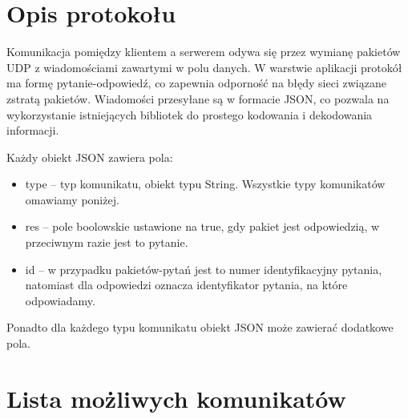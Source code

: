 \documentclass[a4paper, 10pt]{article}
\begin{document}
\tableofcontents

\newpage
\section{Opis protokołu}
Komunikacja pomiędzy klientem a serwerem odywa się przez wymianę pakietów UDP z wiadomościami zawartymi w polu danych. W warstwie aplikacji protokół ma formę pytanie-odpowiedź, co zapewnia odporność na błędy sieci związane zstratą pakietów. Wiadomości przesyłane są w formacie JSON, co pozwala na wykorzystanie istniejących bibliotek do prostego kodowania i dekodowania informacji.

Każdy obiekt JSON zawiera pola:
\begin{itemize}
 \item type -- typ komunikatu, obiekt typu String. Wszystkie typy komunikatów omawiamy poniżej.
 \item res -- pole boolowskie ustawione na true, gdy pakiet jest odpowiedzią, w przeciwnym razie jest to pytanie.
 \item id -- w przypadku pakietów-pytań jest to numer identyfikacyjny pytania, natomiast dla odpowiedzi oznacza identyfikator pytania, na które odpowiadamy.
\end{itemize}
Ponadto dla każdego typu komunikatu obiekt JSON może zawierać dodatkowe pola.

\section{Lista możliwych komunikatów}
\end{document}
